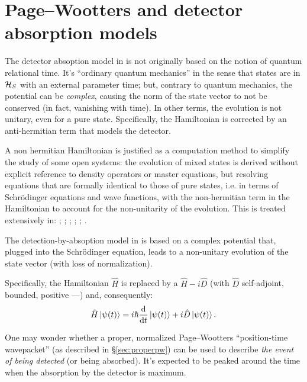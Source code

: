\section{Page--Wootters and detector absorption models}\label{sec:absorption+pw}

The detector absoption model in \cite{RuschhauptAbsorption} is not originally
based on the notion of quantum relational time. It's ``ordinary quantum mechanics''
in the sense that states are in $\mathcal{H}_S$ with an external parameter time;
but, contrary to quantum mechanics, the potential can be \emph{complex},
causing the norm of the state vector to not be conserved (in fact, vanishing with time).
In other terms, the evolution is not unitary, even for a pure state.
Specifically, the Hamiltonian is corrected by an anti-hermitian term
that models the detector.

A non hermitian Hamiltonian is justified as a computation method
to simplify the study of some open systems: the evolution of mixed
states is derived without explicit reference to density operators
or master equations, but resolving equations that are formally
identical to those of pure states,
i.e. in terms of
Schr{\"o}dinger equations and wave functions,
with the non-hermitian term in the Hamiltonian
to account for the non-unitarity of the evolution.
%
This is treated extensively in:
  \cite[Ch. 6]{TQM2};
  \cite{Wave-function_approach};
  \cite{HowToResetAnAtom};
  \cite{TheQuantumJumpApproach};
  \cite[\S 8.5.2 ``The `quantum jump' approach to damping: The wave function Monte Carlo approach'']{ScullyZubairy};
  \cite[\S 6.7.1 ``Simulating Quantum Trajectories'']{WallsMilburn}.

The detection-by-absoption model in \cite{RuschhauptAbsorption}
is based on a complex potential that, plugged into the Schr\"odinger equation,
leads to a non-unitary evolution of the state vector
(with loss of normalization).

Specifically, the Hamiltonian $\hat{H}$ is replaced by a $\hat{H} - i\hat{D}$
(with $\hat{D}$ self-adjoint, bounded, positive ---\cite{RuschhauptAbsorption})
and, consequently:
\begin{equation}\label{eq:schrod_complex_pot}
  \hat{H} \ket{\psi(t)} = i\hbar\dv{t}\ket{\psi(t)} +i\hat{D}\ket{\psi(t)} \text{.}
\end{equation}

One may wonder whether a proper, normalized Page--Wootters ``position-time wavepacket''
(as described in \S\ref{sec:properpw})
can be used to describe \emph{the event of being detected} (or being absorbed).
It's expected to be peaked around the time when the absorption by the detector is maximum.

